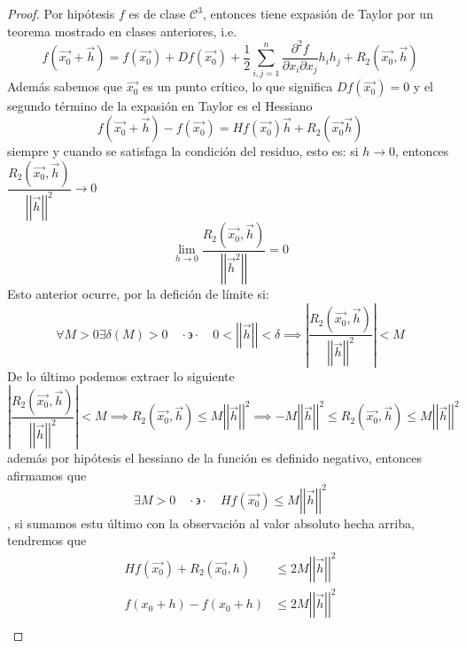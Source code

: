 \documentclass[letterpaper]{article}
\renewcommand{\d}{\partial}
\providecommand{\abs}[1]{\left|#1\right|}
\providecommand{\norm}[1]{\left|\left|#1\right|\right|}
\newcommand{\tq}{ \quad \cdot  \backepsilon \cdot \quad }
\renewcommand{\*}{\cdot}
\theoremstyle{definition}
\begin{document}
\begin{proof}
	Por hipótesis $ f $ es de clase $ \mathcal{C}^3 $, entonces tiene expasión de Taylor por un teorema mostrado en clases anteriores, i.e.
	\[ f(\vec{x_0} + \vec{h}) = f(\vec{x_0}) + Df(\vec{x_0}) + \dfrac{1}{2}\sum_{i,j = 1}^{n} \dfrac{\d^2 f}{\d x_i \d x_j} h_i h_j + R_2(\vec{x_0},\vec{h}) \]
	Además sabemos que $ \vec{x_0} $ es un punto crítico, lo que significa $ Df(\vec{x_0}) = 0 $ y el segundo término de la expasión en Taylor es el Hessiano
	\[ f(\vec{x_0} + \vec{h}) - f(\vec{x_0}) = Hf(\vec{x_0})\vec{h} + R_2(\vec{x_0}\vec{h})  \] siempre y cuando se satisfaga la condición del residuo, esto es:
	si $ h \to 0 $, entonces $ \dfrac{R_2 (\vec{x_0},\vec{h})}{\norm{\vec{h}}^2} \to 0$
	\[ \lim\limits_{h \to 0} \dfrac{R_2(\vec{x_0},\vec{h})}{\norm{\vec{h}^2}} = 0 \]
	Esto anterior ocurre, por la defición de límite si:
	\[ \forall M > 0 \exists \delta(M) > 0 \tq 0 < \norm{\vec{h}} <  \delta \implies \abs{\dfrac{R_2(\vec{x_0},\vec{h})}{\norm{\vec{h}}^2}} < M \]
	De lo último podemos extraer lo siguiente
	\[ \abs{\dfrac{R_2(\vec{x_0},\vec{h})}{\norm{\vec{h}}^2}} < M \implies R_2(\vec{x_0},\vec{h}) \leq M\norm{\vec{h}}^2 \implies -M \norm{\vec{h}}^2 \leq R_2(\vec{x_0},\vec{h}) \leq M\norm{\vec{h}}^2  \] además por hipótesis el hessiano de la función es definido negativo, entonces afirmamos que $$ \exists M > 0 \tq Hf(\vec{x_0}) \leq M\norm{\vec{h}}^2 $$, si sumamos estu último con la observación al valor absoluto hecha arriba, tendremos que 
	\begin{align*}
		Hf(\vec{x_0}) + R_2(\vec{x_0},h) &\leq 2M\norm{\vec{h}}^2 \\
		f(x_0 + h) - f(x_0 + h)&\leq 2M\norm{\vec{h}}^2 \\
	\end{align*}
\end{proof}
\end{document}
